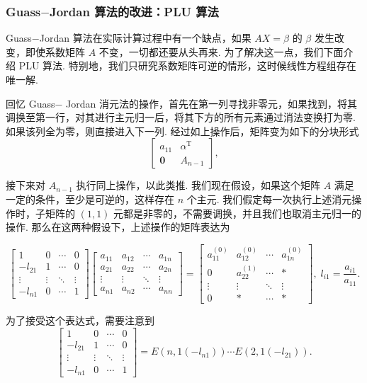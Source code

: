 \documentclass[10pt,openany]{article}
\theoremstyle{thmstyle} %
\theoremstyle{defstyle} %
\theoremstyle{prostyle} %
\theoremstyle{exastyle}
\theoremstyle{remstyle}
\newcommand{\T}{^{\text{T}}}
\begin{document}
\subsubsection{Guass\(-\)Jordan 算法的改进：PLU 算法}

Guass\(-\)Jordan 算法在实际计算过程中有一个缺点，如果 \( AX=\beta \) 的 \( \beta \) 发生改变，即使系数矩阵 \( A \) 不变，一切都还要从头再来. 为了解决这一点，我们下面介绍 PLU 算法. 特别地，我们只研究系数矩阵可逆的情形，这时候线性方程组存在唯一解.

回忆 Guass\(-\) Jordan 消元法的操作，首先在第一列寻找非零元，如果找到，将其调换至第一行，对其进行主元归一后，将其下方的所有元素通过消法变换打为零. 如果该列全为零，则直接进入下一列. 经过如上操作后，矩阵变为如下的分块形式
\[ \begin{bmatrix}
	a_{11} & \alpha\T \\
	\bm{0} & A_{n-1}
\end{bmatrix}, \]

接下来对 \( A_{n-1} \) 执行同上操作，以此类推. 我们现在假设，如果这个矩阵 \( A \) 满足一定的条件，至少是可逆的，这样存在 \( n \) 个主元. 我们假定每一次执行上述消元操作时，子矩阵的 \( (1,1) \) 元都是非零的，不需要调换，并且我们也取消主元归一的操作. 那么在这两种假设下，上述操作的矩阵表达为

\[  \begin{bmatrix}
	1 & 0 & \cdots & 0\\
	-l_{21} & 1 & \cdots & 0 \\
	\vdots & \vdots & \ddots & \vdots \\
	-l_{n1} & 0 & \cdots & 1
\end{bmatrix}\begin{bmatrix}
	a_{11} & a_{12} & \cdots & a_{1n} \\
	a_{21} & a_{22} & \cdots & a_{2n} \\
	\vdots & \vdots & \ddots & \vdots \\
	a_{n1} & a_{n2} & \cdots & a_{nn}
\end{bmatrix}=\begin{bmatrix}
	a_{11}^{(0)} & a_{12}^{(0)} & \cdots & a_{1n}^{(0)} \\[1ex]
	0 & a_{22}^{(1)} & \cdots & * \\[1ex]
	\vdots & \vdots & \ddots & \vdots \\[1ex]
	0 & * & \cdots & *
\end{bmatrix}, \; l_{i1}=\frac{a_{i1}}{a_{11}}. \]

为了接受这个表达式，需要注意到
\[ \begin{bmatrix}
	1 & 0 & \cdots & 0\\
	-l_{21} & 1 & \cdots & 0 \\
	\vdots & \vdots & \ddots & \vdots \\
	-l_{n1} & 0 & \cdots & 1
\end{bmatrix}=E(n,1(-l_{n1}))\cdots E(2,1(-l_{21})). \]
\end{document}
